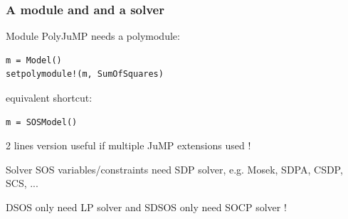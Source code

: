 \documentclass{beamer}
\begin{document}
  \begin{frame}[fragile]
    \frametitle{A module and and a solver}
    \begin{block}{Module}
    PolyJuMP needs a polymodule:
\begin{verbatim}
m = Model()
setpolymodule!(m, SumOfSquares)
\end{verbatim}
    \alert{equivalent} shortcut:
\begin{verbatim}
m = SOSModel()
\end{verbatim}
    2 lines version useful if \alert{multiple} JuMP extensions used !
    \end{block}
    \begin{block}{Solver}
      SOS variables/constraints need \alert{SDP} solver, e.g. Mosek, SDPA, CSDP, SCS, ...

      DSOS only need \alert{LP} solver and SDSOS only need \alert{SOCP} solver !
    \end{block}
  \end{frame}
\end{document}
